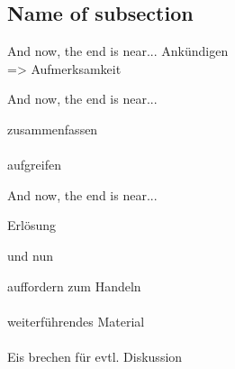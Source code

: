 {\Huge

\subsection{Name of subsection}
\begin{frame}{And now, the end is near...}
\pause
{\center Ankündigen\\}
\pause
\hfill {\small=> Aufmerksamkeit}

\end{frame}


\begin{frame}{And now, the end is near...}
\pause

\begin{center}{ 

zusammenfassen\\
\ \\\pause
  aufgreifen

}\end{center}

\end{frame}


\begin{frame}{And now, the end is near...}
\begin{center}
Erlösung
\end{center}
\end{frame}


\begin{frame}{und nun}
\pause
\begin{center}
auffordern zum Handeln\pause
\\\ \\
weiterführendes Material
\\\ \\
Eis brechen für evtl. Diskussion
\end{center}

\end{frame}

}
